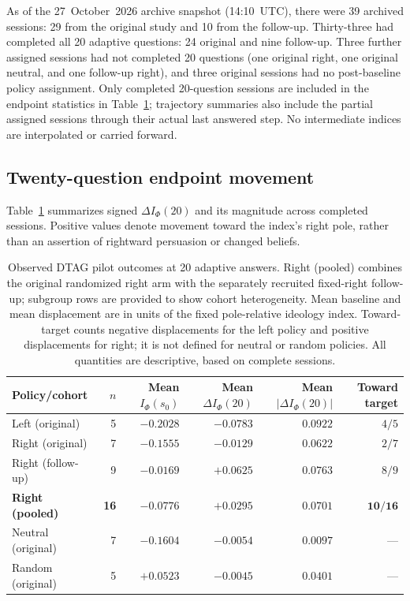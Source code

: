 As of the 27~October~2026 archive snapshot (14:10~UTC), there were
39 archived sessions: 29 from the original study and 10 from the follow-up.
Thirty-three had completed all 20 adaptive questions: 24 original and nine
follow-up. Three further assigned sessions had not completed 20 questions
(one original right, one original neutral, and one follow-up right), and three
original sessions had no post-baseline policy assignment. Only completed
20-question sessions are included in the endpoint statistics in
Table~\ref{tab:dtag-human-endpoints}; trajectory summaries also include the
partial assigned sessions through their actual last answered step.
No intermediate indices are interpolated or carried forward.

\subsection{Twenty-question endpoint movement}
Table~\ref{tab:dtag-human-endpoints} summarizes signed
\mbox{$\Delta I_\Phi(20)$} and its magnitude across completed sessions.
Positive values denote movement toward the index's right pole, rather than
an assertion of rightward persuasion or changed beliefs.

\begin{table}[t]
\centering
\caption{Observed DTAG pilot outcomes at 20 adaptive answers. Right (pooled)
combines the original randomized right arm with the separately recruited
fixed-right follow-up; subgroup rows are provided to show cohort heterogeneity.
Mean baseline and mean displacement are in units of the fixed pole-relative
ideology index. Toward-target counts negative displacements for the left
policy and positive displacements for right; it is not defined for neutral or
random policies. All quantities are descriptive, based on complete sessions.}
\label{tab:dtag-human-endpoints}
\small
\begin{tabular}{lrrrrr}
\toprule
Policy/cohort & $n$ & Mean $I_\Phi(s_0)$ & Mean $\Delta I_\Phi(20)$ & Mean $|\Delta I_\Phi(20)|$ & Toward target \\
\midrule
Left (original) & 5 & $-0.2028$ & $-0.0783$ & $0.0922$ & $4/5$ \\
Right (original) & 7 & $-0.1555$ & $-0.0129$ & $0.0622$ & $2/7$ \\
Right (follow-up) & 9 & $-0.0169$ & $+0.0625$ & $0.0763$ & $8/9$ \\
\textbf{Right (pooled)} & \textbf{16} & $-0.0776$ & $\mathbf{+0.0295}$ & $\mathbf{0.0701}$ & $\mathbf{10/16}$ \\
Neutral (original) & 7 & $-0.1604$ & $-0.0054$ & $0.0097$ & --- \\
Random (original) & 5 & $+0.0523$ & $-0.0045$ & $0.0401$ & --- \\
\bottomrule
\end{tabular}
\end{table}

